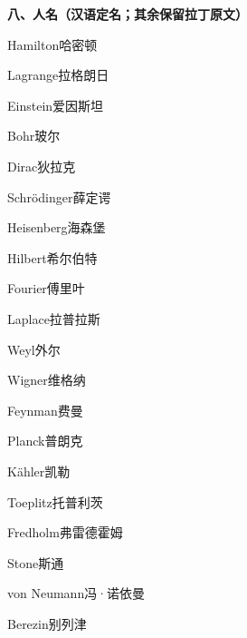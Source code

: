 \filbreak
\vspace{0.9em}
\noindent\textbf{八、人名（汉语定名；其余保留拉丁原文）}\par\nobreak\vspace{0.35em}
\begin{multicols}{2}
\raggedright
\setlength{\parindent}{0pt}
\setlength{\parskip}{0.16em}
\linespread{1.02}\selectfont
Hamilton\hspace{0.9em}哈密顿\par
Lagrange\hspace{0.9em}拉格朗日\par
Einstein\hspace{0.9em}爱因斯坦\par
Bohr\hspace{0.9em}玻尔\par
Dirac\hspace{0.9em}狄拉克\par
Schrödinger\hspace{0.9em}薛定谔\par
Heisenberg\hspace{0.9em}海森堡\par
Hilbert\hspace{0.9em}希尔伯特\par
Fourier\hspace{0.9em}傅里叶\par
Laplace\hspace{0.9em}拉普拉斯\par
Weyl\hspace{0.9em}外尔\par
Wigner\hspace{0.9em}维格纳\par
Feynman\hspace{0.9em}费曼\par
Planck\hspace{0.9em}普朗克\par
Kähler\hspace{0.9em}凯勒\par
Toeplitz\hspace{0.9em}托普利茨\par
Fredholm\hspace{0.9em}弗雷德霍姆\par
Stone\hspace{0.9em}斯通\par
von Neumann\hspace{0.9em}冯·诺依曼\par
Berezin\hspace{0.9em}别列津\par

\end{multicols}
